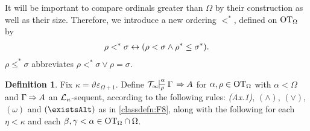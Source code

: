 \documentclass[UKenglish,cleveref,DIV=12]{scrartcl}
\let\exists\existsAlt
\theoremstyle{definition}
\newtheorem{definition}[lemma]{Definition}
\theoremstyle{definition}
\begin{document}
It will be important to compare ordinals greater than $\Omega$ by their construction as well as their size. Therefore, we introduce a new ordering $<^*$, defined on $\mathrm{OT}_\Omega$ by
\begin{align*}
  \rho<^*\sigma\leftrightarrow(\rho<\sigma\land\rho^*\le\sigma^*).
\end{align*}
$\rho\le^*\sigma$ abbreviates $\rho<^*\sigma\lor\rho=\sigma$.
\begin{definition}%
Fix $\kappa=\vartheta\varepsilon_{\Omega+1}$. Define $\Tinfty\prov{\alpha}{\rho}
\Gamma \sa A$ for $\alpha, \rho\in\mathrm{OT}_\Omega$ with $\alpha<\Omega$ and $\Gamma \mathbin\Rightarrow A$ an $\mathcal{L}_\kappa$-sequent, according to the
following rules: {\em (Ax.1)}, $(\wedge)$, $(\lor)$, $(\omega)$ and $(\exists)$
as in \cref{classdefn:F8}, along with the following for each $\eta<\kappa$ and each
$\beta,\gamma<\alpha\in\mathrm{OT}_\Omega\cap\Omega$.
\end{definition}
\end{document}
